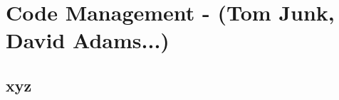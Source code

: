 \chapter{Code Management - (Tom Junk, David Adams...)}
\label{ch:codemgmt}

\section{xyz}
\label{sec:codemgmt:xyz}  %

